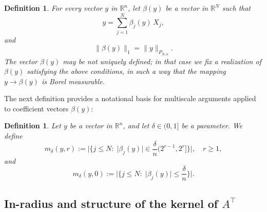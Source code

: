 \documentclass[11pt]{amsart}
\newtheorem{definition}[theorem]{Definition}
\theoremstyle{definition}
\theoremstyle{plain}
\newcommand{\R}{\mathbb{R}}
\def\R{{\mathbb R}}
\begin{document}
\begin{definition}\label{def: beta 09812720894}
For every vector $y$ in $\R^n$,
let $\beta(y)$ be a vector in $\R^N$
such that
$$
y=\sum\limits_{j=1}^N \beta_j(y)\,X_j,
$$
and
$$
\|\beta(y)\|_1=\|y\|_{P_{N,n}}.
$$
The vector $\beta(y)$ may be not uniquely defined;
in that case we fix a realization of $\beta(y)$
satisfying the above conditions, in such a way that the mapping
$y\to \beta(y)$ is Borel measurable.
\end{definition}

The next definition provides a notational
basis for multiscale arguments applied
to coefficient vectors $\beta(y)$:

\begin{definition}\label{def: myr 334q}
Let $y$ be a vector in $\R^n$, and let $\delta\in(0,1]$
be a parameter.
We define
$$
m_\delta(y,r):=\Big|\Big\{
j\leq N:\;\big|\beta_j(y)\big|\in
\frac{\delta}{n}\big(2^{r-1},2^r\big]\Big\}\Big|,
\quad r\geq 1,
$$
and
$$
m_\delta(y,0):=\Big|\Big\{
j\leq N:\;\big|\beta_j(y)\big|\leq 
\frac{\delta}{n}\Big\}\Big|.
$$
\end{definition}





\subsection{In-radius and structure of the kernel of $A^\top$}
\end{document}
